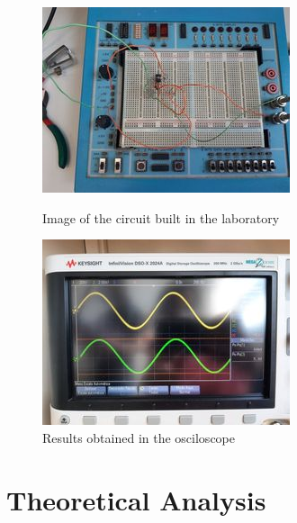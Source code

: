 \begin{figure}[h] \centering
  \begin{minipage}{.5\textwidth}
    \includegraphics[width=.9\textwidth]{lab1.jpg}
    \caption{Image of the circuit built in the laboratory}
    \label{fig:simenv}
    \end{minipage}%
  \begin{minipage}{.5\textwidth}
  \centering
    \includegraphics[width=.9\textwidth]{lab2.jpg}
    \caption{Results obtained in the osciloscope}
    \label{fig:compenv}
      \end{minipage}%
\end{figure}

\section{Theoretical Analysis} \label{sec:analysis}

